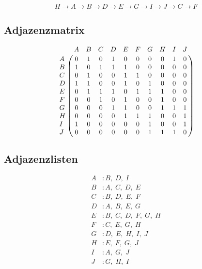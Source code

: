 \documentclass[a4paper, 12pt, margins=3cm]{homework}
\begin{document}
  \begin{problem}
    
  \end{problem}
  \begin{solution}
    \[ H\rightarrow A\rightarrow B\rightarrow D\rightarrow E\rightarrow G
       \rightarrow I\rightarrow J\rightarrow C\rightarrow F \]
  \end{solution}


  \begin{problem}
    
  \end{problem}
  \begin{solution}\hfill 
    \subsection*{Adjazenzmatrix}
    \[ 
      \bordermatrix {
        ~ & A & B & C & D & E & F & G & H & I & J \cr
        A & 0 & 1 & 0 & 1 & 0 & 0 & 0 & 0 & 1 & 0 \cr
        B & 1 & 0 & 1 & 1 & 1 & 0 & 0 & 0 & 0 & 0 \cr
        C & 0 & 1 & 0 & 0 & 1 & 1 & 0 & 0 & 0 & 0 \cr
        D & 1 & 1 & 0 & 0 & 1 & 0 & 1 & 0 & 0 & 0 \cr
        E & 0 & 1 & 1 & 1 & 0 & 1 & 1 & 1 & 0 & 0 \cr
        F & 0 & 0 & 1 & 0 & 1 & 0 & 0 & 1 & 0 & 0 \cr
        G & 0 & 0 & 0 & 1 & 1 & 0 & 0 & 1 & 1 & 1 \cr
        H & 0 & 0 & 0 & 0 & 1 & 1 & 1 & 0 & 0 & 1 \cr
        I & 1 & 0 & 0 & 0 & 0 & 0 & 1 & 0 & 0 & 1 \cr
        J & 0 & 0 & 0 & 0 & 0 & 0 & 1 & 1 & 1 & 0
      } 
    \]

    \subsection*{Adjazenzlisten}
    \begin{align*}
      A & : B,\; D,\; I \\
      B & : A,\; C,\; D,\; E \\
      C & : B,\; D,\; E,\; F \\
      D & : A,\; B,\; E,\; G \\
      E & : B,\; C,\; D,\; F,\; G,\; H \\
      F & : C,\; E,\; G,\; H \\
      G & : D,\; E,\; H,\; I,\; J \\
      H & : E,\; F,\; G,\; J \\
      I & : A,\; G,\; J \\
      J & : G,\; H,\; I
    \end{align*}
  \end{solution}
\end{document}
